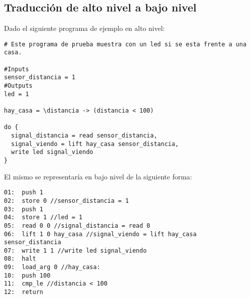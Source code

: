 \pagebreak
\subsection{Traducción de alto nivel a bajo nivel}

Dado el siguiente programa de ejemplo en alto nivel:

\begin{verbatim}
# Este programa de prueba muestra con un led si se esta frente a una casa.

#Inputs
sensor_distancia = 1
#Outputs
led = 1

hay_casa = \distancia -> (distancia < 100)

do {
  signal_distancia = read sensor_distancia,
  signal_viendo = lift hay_casa sensor_distancia,
  write led signal_viendo
}
\end{verbatim}

El mismo se representaría en bajo nivel de la siguiente forma:

\begin{verbatim}
01:  push 1
02:  store 0 //sensor_distancia = 1
03:  push 1
04:  store 1 //led = 1
05:  read 0 0 //signal_distancia = read 0
06:  lift 1 0 hay_casa //signal_viendo = lift hay_casa sensor_distancia
07:  write 1 1 //write led signal_viendo
08:  halt
09:  load_arg 0 //hay_casa:
10:  push 100
11:  cmp_le //distancia < 100
12:  return
\end{verbatim}
